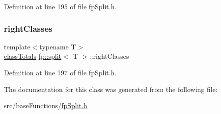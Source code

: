 Definition at line 195 of file fp\+Split.\+h.

\mbox{\label{classfp_1_1split_af5366297f7de9b8ff0911186300bab7e}} 
\subsubsection{\texorpdfstring{right\+Classes}{rightClasses}}
{\footnotesize\ttfamily template$<$typename T$>$ \\
\hyperlink{classfp_1_1classTotals}{class\+Totals} \hyperlink{classfp_1_1split}{fp\+::split}$<$ T $>$\+::right\+Classes\hspace{0.3cm}{\ttfamily [protected]}}



Definition at line 197 of file fp\+Split.\+h.



The documentation for this class was generated from the following file\+:\begin{DoxyCompactItemize}
\item 
src/base\+Functions/\hyperlink{fpSplit_8h}{fp\+Split.\+h}\end{DoxyCompactItemize}

